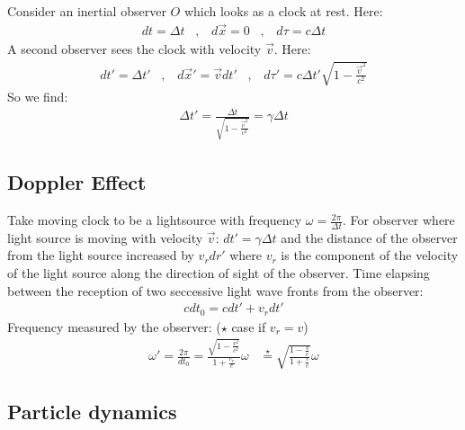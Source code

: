 Consider an inertial observer $O$ which looks as a clock at rest. Here:
\begin{align*}
    d t = \Delta t
    \hspace{10pt} , \hspace{10pt}
    d \vec{x} = 0
    \hspace{10pt} , \hspace{10pt}
    d \tau = c \Delta t
\end{align*}
A second observer sees the clock with velocity $\vec{v}$. Here:
\begin{align*}
    dt' = \Delta t'
    \hspace{10pt} , \hspace{10pt}
    d \vec{x}' = \vec{v} dt'
    \hspace{10pt} , \hspace{10pt}
    d \tau' = c \Delta t' \sqrt{1 - \frac{\vec{v}^2}{c^2}}
\end{align*}
So we find:
\begin{align*}
    \Delta t' = \frac{\Delta t}{\sqrt{1 - \frac{\vec{v}^2}{c^2}}}
    = \gamma \Delta t
\end{align*}

\subsection{Doppler Effect}

Take moving clock to be a lightsource with frequency $\omega = \frac{2 \pi}{\Delta t}$.
For observer where light source is moving with velocity $\vec{v}$:
$dt' = \gamma \Delta t$ and the distance of the observer from the light
source increased by $v_r dr'$ where $v_r$ is the component of the velocity
of the light source along the direction of sight of the observer. Time
elapsing between the reception of two seccessive light wave fronts from the
observer:
\begin{align*}
    c dt_0 = c dt' + v_r dt'
\end{align*}
Frequency measured by the observer: ($\star$ case if $v_r = v$)
\begin{align*}
    \omega' = \frac{2 \pi}{dt_0} = \frac{\sqrt{1 - \frac{v^2}{c^2}}}{1 + \frac{v_r}{c}} \omega
    \hspace{10pt} \stackrel{\star}{=} \sqrt{\frac{1 - \frac{v}{c}}{1 + \frac{v}{c}}} \omega
\end{align*}

\subsection{Particle dynamics}


